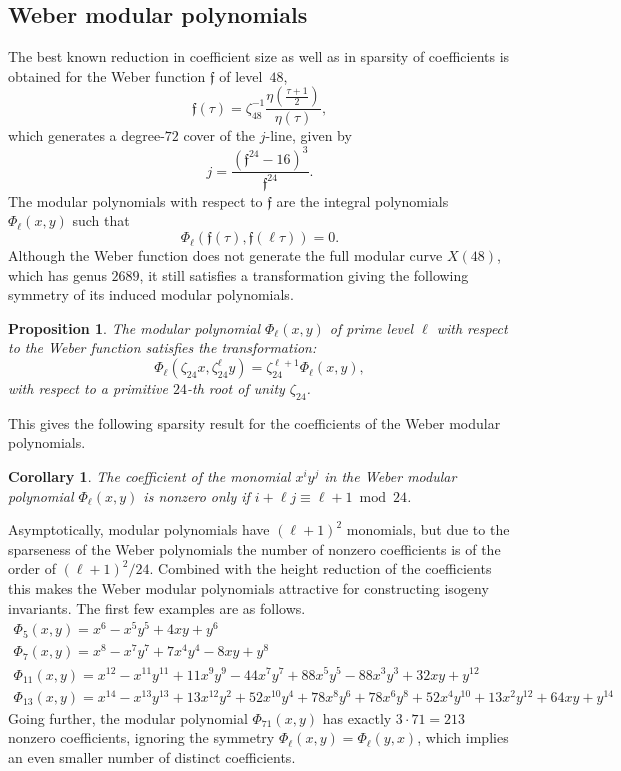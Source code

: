 \documentclass{amsart}
\newcommand{\ff}{\mathfrak{f}}
\newtheorem{corollary}[theorem]{Corollary}
\newtheorem{proposition}[theorem]{Proposition}
\begin{document}
\subsection*{Weber modular polynomials}

The best known reduction in coefficient size as well as in sparsity of coefficients
is obtained for the Weber function $\ff$ of level~$48$,
$$
\ff(\tau) = \zeta_{48}^{-1} \frac{\eta\left(\frac{\tau+1}{2}\right)}{\eta(\tau)},
$$
which generates a degree-$72$ cover of the $j$-line, given by
$$
j = \frac{(\ff^{24}-16)^3}{\ff^{24}}.
$$
The modular polynomials with respect to $\ff$ are the integral polynomials
$\Phi_\ell(x,y)$ such that
$$
\Phi_\ell(\ff(\tau),\ff(\ell\tau)) = 0.
$$
Although the Weber function does not generate the full modular curve $X(48)$,
which has genus $2689$, it still satisfies a transformation giving the following
symmetry of its induced modular polynomials.

\begin{proposition}
  \label{prop:Weber_trans}
  The modular polynomial $\Phi_\ell(x,y)$ of prime level $\ell$ with respect to the Weber
  function satisfies the transformation:
  $$
  \Phi_\ell(\zeta_{24} x,\zeta_{24}^\ell y) = \zeta_{24}^{\ell+1} \Phi_\ell(x,y),
  $$
  with respect to a primitive $24$-th root of unity $\zeta_{24}$.
\end{proposition}

\noindent
This gives the following sparsity result for the coefficients of the Weber modular polynomials.

\begin{corollary}
  \label{cor:Weber_sparcity}
  The coefficient of the monomial $x^iy^j$ in the Weber modular polynomial
  $\Phi_\ell(x,y)$ is nonzero only if $i+\ell j \equiv \ell+1 \bmod 24$.
\end{corollary}

Asymptotically, modular polynomials have $(\ell+1)^2$ monomials, but due
to the sparseness of the Weber polynomials the number of nonzero
coefficients is of the order of $(\ell+1)^2/24$.
Combined with the height reduction of the coefficients this makes the
Weber modular polynomials attractive for constructing isogeny invariants.
The first few examples are as follows.
$$
\begin{array}{l}
\Phi_5(x,y) = x^6 - x^5 y^5 + 4 x y + y^6\\
\Phi_7(x,y) = x^8 - x^7 y^7 + 7 x^4 y^4 - 8 x y + y^8\\
\Phi_{11}(x,y) = x^{12} - x^{11} y^{11} + 11 x^9 y^9 - 44 x^7 y^7 + 88 x^5 y^5 - 88 x^3 y^3 + 32 x y + y^{12}\\
\Phi_{13}(x,y) = x^{14} - x^{13} y^{13} + 13 x^{12} y^2 + 52 x^{10} y^4 + 78 x^8 y^6 + 78 x^6 y^8 + 52 x^4 y^{10} + 13 x^2 y^{12} + 64 x y + y^{14}
\end{array}
$$
Going further, the modular polynomial $\Phi_{71}(x,y)$ has exactly $3\cdot 71 = 213$
nonzero coefficients, ignoring the symmetry $\Phi_\ell(x,y) = \Phi_\ell(y,x)$, which
implies an even smaller number of distinct coefficients.
\end{document}
